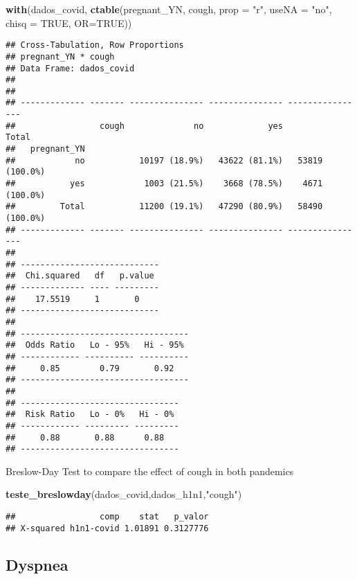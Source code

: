 \documentclass[
]{article}
\newenvironment{Shaded}{\begin{snugshade}}{\end{snugshade}}
\newcommand{\DataTypeTok}[1]{\textcolor[rgb]{0.13,0.29,0.53}{#1}}
\newcommand{\KeywordTok}[1]{\textcolor[rgb]{0.13,0.29,0.53}{\textbf{#1}}}
\newcommand{\NormalTok}[1]{#1}
\newcommand{\OtherTok}[1]{\textcolor[rgb]{0.56,0.35,0.01}{#1}}
\newcommand{\StringTok}[1]{\textcolor[rgb]{0.31,0.60,0.02}{#1}}
\begin{document}
\begin{Shaded}
\begin{Highlighting}[]
\KeywordTok{with}\NormalTok{(dados_covid, }\KeywordTok{ctable}\NormalTok{(pregnant_YN, cough, }\DataTypeTok{prop =} \StringTok{"r"}\NormalTok{, }\DataTypeTok{useNA =} \StringTok{"no"}\NormalTok{, }\DataTypeTok{chisq =} \OtherTok{TRUE}\NormalTok{, }\DataTypeTok{OR=}\OtherTok{TRUE}\NormalTok{))}
\end{Highlighting}
\end{Shaded}

\begin{verbatim}
## Cross-Tabulation, Row Proportions  
## pregnant_YN * cough  
## Data Frame: dados_covid  
## 
## 
## ------------- ------- --------------- --------------- ----------------
##                 cough              no             yes            Total
##   pregnant_YN                                                         
##            no           10197 (18.9%)   43622 (81.1%)   53819 (100.0%)
##           yes            1003 (21.5%)    3668 (78.5%)    4671 (100.0%)
##         Total           11200 (19.1%)   47290 (80.9%)   58490 (100.0%)
## ------------- ------- --------------- --------------- ----------------
## 
## ----------------------------
##  Chi.squared   df   p.value 
## ------------- ---- ---------
##    17.5519     1       0    
## ----------------------------
## 
## ----------------------------------
##  Odds Ratio   Lo - 95%   Hi - 95% 
## ------------ ---------- ----------
##     0.85        0.79       0.92   
## ----------------------------------
## 
## --------------------------------
##  Risk Ratio   Lo - 0%   Hi - 0% 
## ------------ --------- ---------
##     0.88       0.88      0.88   
## --------------------------------
\end{verbatim}

Breslow-Day Test to compare the effect of cough in both pandemics

\begin{Shaded}
\begin{Highlighting}[]
\KeywordTok{teste_breslowday}\NormalTok{(dados_covid,dados_h1n1,}\StringTok{"cough"}\NormalTok{)}
\end{Highlighting}
\end{Shaded}

\begin{verbatim}
##                 comp    stat   p_valor
## X-squared h1n1-covid 1.01891 0.3127776
\end{verbatim}

\hypertarget{dyspnea}{%
\subsection{Dyspnea}\label{dyspnea}}
\end{document}
